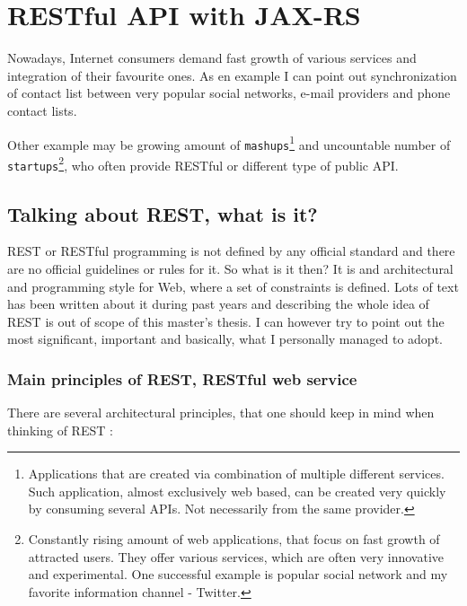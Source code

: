\chapter{RESTful API with JAX-RS}\label{rest}

	Nowadays, Internet consumers demand fast growth of various services and integration of their favourite ones. As en
	example I can point out synchronization of contact list between very popular social networks, e-mail providers and
	phone contact lists. 
	
	Other example may be growing amount of \verb|mashups|\footnote{Applications that are created via
	combination of multiple different services. Such application, almost exclusively web based, can be created very quickly
	by consuming several \gls{API}s. Not necessarily from the same provider.} and uncountable number of
	\verb|startups|\footnote{Constantly rising amount of web applications, that focus on fast growth of attracted users.
	They offer various services, which are often very innovative and experimental. One successful example is popular
	social network and my favorite information channel - Twitter.}, who often provide RESTful or different type of public
	\gls{API}.

	\section{Talking about REST, what is it?}
	
	\gls{REST} or RESTful programming is not defined by any official standard and there are no official guidelines or rules
	for it.
	So what is it then? It is and architectural and programming style for Web, where a set of constraints is defined. Lots
	of text has been written about it during past years and describing the whole idea of REST is out of scope of this
	master's thesis. I can however try to point out the most significant, important and basically, what I personally
	managed to adopt.
	
	\subsection{Main principles of REST, RESTful web service}
	
	There are several architectural principles, that one should keep in mind when thinking of REST \cite[p.~3]{restful}:
	
